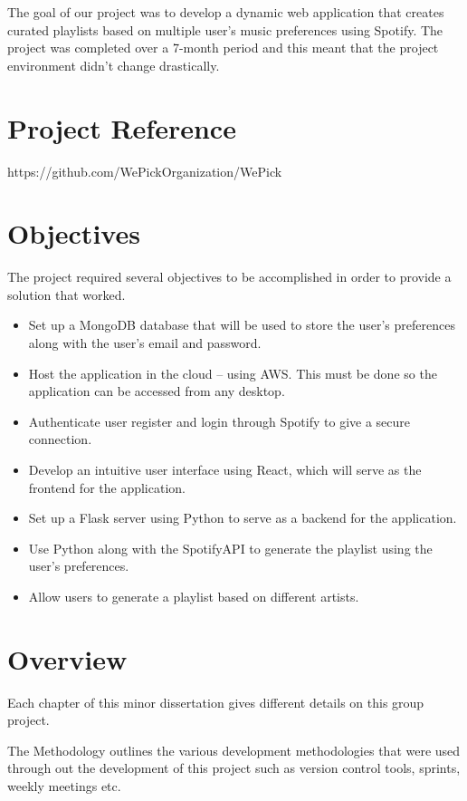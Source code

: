 The goal of our project was to develop a dynamic web application that creates curated playlists based on multiple user's music preferences using Spotify.
The project was completed over a 7-month period and this meant that the project environment didn’t change drastically.

\section{Project Reference}
https://github.com/WePickOrganization/WePick

\section{Objectives}
The project required several objectives to be accomplished in order to provide a solution that worked.
\begin{itemize}
	\item Set up a MongoDB database that will be used to store the user’s preferences along with the user’s email and password.
	\item Host the application in the cloud – using AWS. This must be done so the application can be accessed from any desktop.
	\item Authenticate user register and login through Spotify to give a secure connection.
	\item Develop an intuitive user interface using React, which will serve as the frontend for the application.
	\item Set up a Flask server using Python to serve as a backend for the application.
	\item Use Python along with the SpotifyAPI to generate the playlist using the user’s preferences.
	\item Allow users to generate a playlist based on different artists.
\end{itemize}

\section{Overview}
Each chapter of this minor dissertation gives different details on this group project.\newline

The Methodology outlines the various development methodologies that were used through out the development of this project such as version control tools, sprints, weekly meetings etc.\newline

